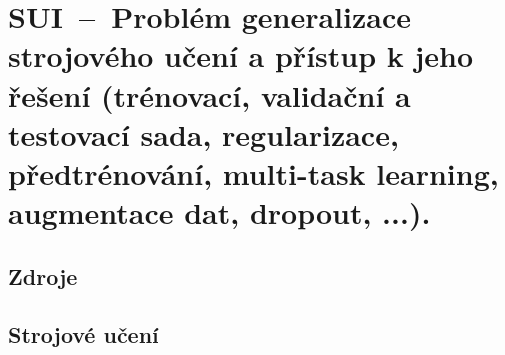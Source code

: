 

\graphicspath{{sui/strojove_uceni_generalizace/figures}}


\chapter{SUI~--~Problém generalizace strojového učení a přístup k jeho řešení (trénovací, validační a testovací sada, regularizace, předtrénování, multi-task learning, augmentace dat, dropout, ...).}


\section{Zdroje}

\begin{compactitem}
    \item {}
    \item {}
    \item {}
    \item {}
\end{compactitem}


\section{Strojové učení}

